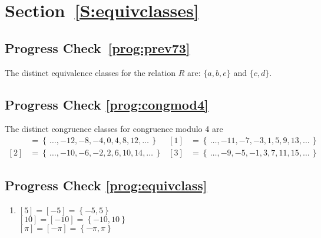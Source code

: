 \section*{Section~\ref{S:equivclasses}}

\subsection*{Progress Check~\ref{prog:prev73}}
The distinct equivalence classes for the relation $R$ are:  $\{a, b, e \}$ and $\{c, d \}$.

\subsection*{Progress Check \ref{prog:congmod4}}
The distinct congruence classes for congruence modulo 4 are
\begin{align*}
[ 0 ] &= \left\{\,\ldots,  -12, -8, -4, 0, 4, 8, 12, \ldots\, \right\}  & 
[ 1 ] &= \left\{\,\ldots,  -11, -7, -3, 1, 5, 9, 13, \ldots\, \right\} \\
[ 2 ] &= \left\{\,\ldots,  -10, -6, -2, 2, 6, 10, 14, \ldots\, \right\} &
[ 3 ] &= \left\{\,\ldots,  -9, -5, -1, 3, 7, 11, 15, \ldots\, \right\}
\end{align*}


\newpage
\subsection*{Progress Check \ref{prog:equivclass}}
\begin{enumerate}
\item \begin{multicols}{2}
$[ 5 ] = [ -5 ] = \left\{ -5, 5 \right\}$ \\
$[ 10 ] = [ -10 ] = \left\{ -10, 10 \right\}$ \\
$[ \pi ] = [ -\pi ] = \left\{ -\pi, \pi \right\}$ \\
\end{multicols}

\end{enumerate}


\hbreak


\endinput

